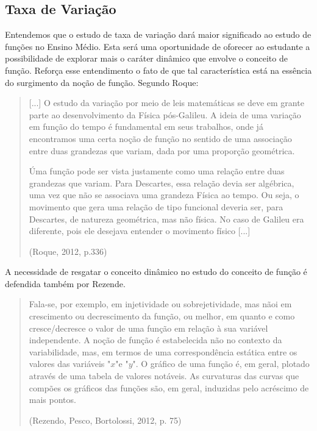 \mainmatter

\begin{apresentacao}
\section{Taxa de Variação}

Entendemos que o estudo de taxa de variação dará maior significado ao estudo de funções no Ensino Médio. Esta será uma oportunidade de oforecer ao estudante a possibilidade de explorar mais o caráter dinâmico que envolve o conceito de função. Reforça esse entendimento o fato de que tal característica está na essência do surgimento da noção de função. Segundo Roque:

\begin{quote}
[...] O estudo da variação por meio de leis matemáticas se deve em grante parte ao desenvolvimento da Física pós-Galileu. A ideia de uma variação em função do tempo é fundamental em seus trabalhos, onde já encontramos uma certa noção de função no sentido de uma associação entre duas grandezas que variam, dada por uma proporção geométrica. 

Úma função pode ser vista justamente como uma relação entre duas grandezas que variam. Para Descartes, essa relação devia ser algébrica, uma vez que não se associava uma grandeza Física ao tempo. Ou seja, o movimento que gera uma relação de tipo funcional deveria ser, para Descartes, de natureza geométrica, mas não física. No caso de Galileu era diferente, pois ele desejava entender o movimento físico [...]
\flushright

(Roque, 2012, p.336)
\end{quote}

A necessidade de resgatar o conceito dinâmico no estudo do conceito de função é defendida também por Rezende.

\begin{quote}
Fala-se, por exemplo, em injetividade ou sobrejetividade, mas nãoi em crescimento ou decrescimento da função, ou melhor, em quanto e como cresce/decresce o valor de uma função em relação à sua variável independente. A noção de função é estabelecida não no contexto da variabilidade, mas, em termos de uma correspondência estática entre os valores das variáveis "$x$"{}e "$y$". O gráfico de uma função é, em geral, plotado através de uma tabela de valores notáveis. As curvaturas das curvas que compões os gráficos das funções são, em geral, induzidas pelo acréscimo de mais pontos.

\flushright
(Rezendo, Pesco, Bortolossi, 2012, p. 75)
\end{quote}


\end{apresentacao}
